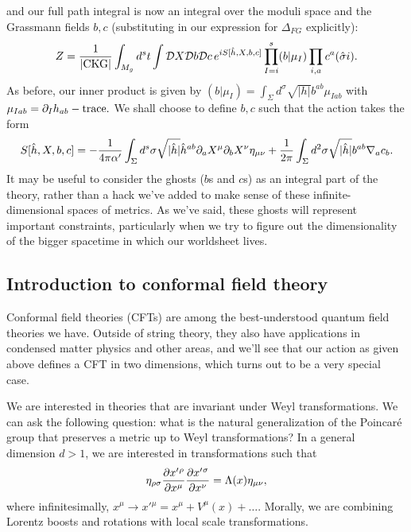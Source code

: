 and our full path integral is now an integral over the moduli space and the Grassmann fields $b,c$ (substituting in our expression for $\Delta_{FG}$ explicitly):
\begin{equation}
    Z=\frac{1}{\abs{\text{CKG}}} \int_{M_g} d^s t \int \cD X \cD b \cD c\, e^{iS[\hat h, X,b,c]} \prod_{I=i}^s (b|\mu_I) \prod_{i,a} c^a (\hat \sigma i).
\end{equation}
As before, our inner product is given by $(b|\mu_I)=\int_\Sigma d^\sigma \sqrt{|h|}b^{ab}\mu_{Iab}$ with $\mu_{Iab}=\p_I h_{ab} -\text{trace}.$ We shall choose to define $b,c$ such that the action takes the form
\begin{equation}
    S[\hat h, X, b,c ]=-\frac{1}{4\pi \alpha'} \int_\Sigma d^s\sigma \sqrt{|\hat h|} \hat h^{ab}\p_a X^ \mu \p_b X^\nu \eta_{\mu\nu}+\frac{1}{2\pi} \int_\Sigma d^2\sigma \sqrt{|\hat h|}b^{ab} \nabla_a c_b.
\end{equation}
It may be useful to consider the ghosts ($b$s and $c$s) as an integral part of the theory, rather than a hack we've added to make sense of these infinite-dimensional spaces of metrics. As we've said, these ghosts will represent important constraints, particularly when we try to figure out the dimensionality of the bigger spacetime in which our worldsheet lives.

\subsection*{Introduction to conformal field theory}
Conformal field theories (CFTs) are among the best-understood quantum field theories we have. Outside of string theory, they also have applications in condensed matter physics and other areas, and we'll see that our action as given above defines a CFT in two dimensions, which turns out to be a very special case.

We are interested in theories that are invariant under Weyl transformations. We can ask the following question: what is the natural generalization of the Poincar\'e group that preserves a metric up to Weyl transformations? In a general dimension $d>1$, we are interested in transformations such that
\begin{equation}
    \eta_{\rho\sigma} \P{x'{}^\rho}{x^\mu}\P{x'{}^\sigma}{x^\nu}=\Lambda(x) \eta_{\mu\nu},
\end{equation}
where infinitesimally, $x^\mu \to x'{}^\mu = x^\mu + V^\mu(x)+\ldots$. Morally, we are combining Lorentz boosts and rotations with local scale transformations.

